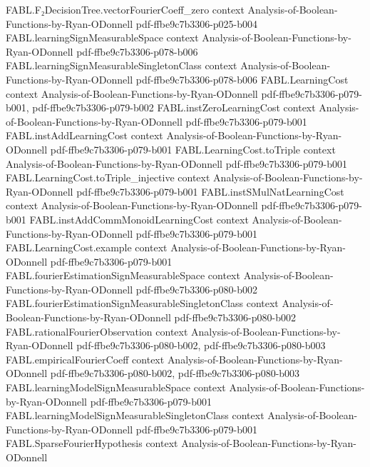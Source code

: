 \begin{theorem}
\proofstep
  {FABL.F₂DecisionTree.vectorFourierCoeff_zero}
  {context}
  {Analysis-of-Boolean-Functions-by-Ryan-ODonnell}
  {pdf-ffbe9c7b3306-p025-b004}
\proofstep
  {FABL.learningSignMeasurableSpace}
  {context}
  {Analysis-of-Boolean-Functions-by-Ryan-ODonnell}
  {pdf-ffbe9c7b3306-p078-b006}
\proofstep
  {FABL.learningSignMeasurableSingletonClass}
  {context}
  {Analysis-of-Boolean-Functions-by-Ryan-ODonnell}
  {pdf-ffbe9c7b3306-p078-b006}
\proofstep
  {FABL.LearningCost}
  {context}
  {Analysis-of-Boolean-Functions-by-Ryan-ODonnell}
  {pdf-ffbe9c7b3306-p079-b001,
    pdf-ffbe9c7b3306-p079-b002}
\proofstep
  {FABL.instZeroLearningCost}
  {context}
  {Analysis-of-Boolean-Functions-by-Ryan-ODonnell}
  {pdf-ffbe9c7b3306-p079-b001}
\proofstep
  {FABL.instAddLearningCost}
  {context}
  {Analysis-of-Boolean-Functions-by-Ryan-ODonnell}
  {pdf-ffbe9c7b3306-p079-b001}
\proofstep
  {FABL.LearningCost.toTriple}
  {context}
  {Analysis-of-Boolean-Functions-by-Ryan-ODonnell}
  {pdf-ffbe9c7b3306-p079-b001}
\proofstep
  {FABL.LearningCost.toTriple_injective}
  {context}
  {Analysis-of-Boolean-Functions-by-Ryan-ODonnell}
  {pdf-ffbe9c7b3306-p079-b001}
\proofstep
  {FABL.instSMulNatLearningCost}
  {context}
  {Analysis-of-Boolean-Functions-by-Ryan-ODonnell}
  {pdf-ffbe9c7b3306-p079-b001}
\proofstep
  {FABL.instAddCommMonoidLearningCost}
  {context}
  {Analysis-of-Boolean-Functions-by-Ryan-ODonnell}
  {pdf-ffbe9c7b3306-p079-b001}
\proofstep
  {FABL.LearningCost.example}
  {context}
  {Analysis-of-Boolean-Functions-by-Ryan-ODonnell}
  {pdf-ffbe9c7b3306-p079-b001}
\proofstep
  {FABL.fourierEstimationSignMeasurableSpace}
  {context}
  {Analysis-of-Boolean-Functions-by-Ryan-ODonnell}
  {pdf-ffbe9c7b3306-p080-b002}
\proofstep
  {FABL.fourierEstimationSignMeasurableSingletonClass}
  {context}
  {Analysis-of-Boolean-Functions-by-Ryan-ODonnell}
  {pdf-ffbe9c7b3306-p080-b002}
\proofstep
  {FABL.rationalFourierObservation}
  {context}
  {Analysis-of-Boolean-Functions-by-Ryan-ODonnell}
  {pdf-ffbe9c7b3306-p080-b002,
    pdf-ffbe9c7b3306-p080-b003}
\proofstep
  {FABL.empiricalFourierCoeff}
  {context}
  {Analysis-of-Boolean-Functions-by-Ryan-ODonnell}
  {pdf-ffbe9c7b3306-p080-b002,
    pdf-ffbe9c7b3306-p080-b003}
\proofstep
  {FABL.learningModelSignMeasurableSpace}
  {context}
  {Analysis-of-Boolean-Functions-by-Ryan-ODonnell}
  {pdf-ffbe9c7b3306-p079-b001}
\proofstep
  {FABL.learningModelSignMeasurableSingletonClass}
  {context}
  {Analysis-of-Boolean-Functions-by-Ryan-ODonnell}
  {pdf-ffbe9c7b3306-p079-b001}
\proofstep
  {FABL.SparseFourierHypothesis}
  {context}
  {Analysis-of-Boolean-Functions-by-Ryan-ODonnell}

\end{theorem}
